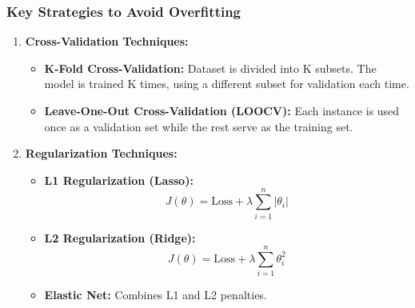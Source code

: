 \documentclass{beamer}
\begin{document}
\begin{frame}[fragile]
    \frametitle{Key Strategies to Avoid Overfitting}
    \begin{enumerate}
        \item \textbf{Cross-Validation Techniques:}
        \begin{itemize}
            \item \textbf{K-Fold Cross-Validation:} Dataset is divided into K subsets. The model is trained K times, using a different subset for validation each time.
            \item \textbf{Leave-One-Out Cross-Validation (LOOCV):} Each instance is used once as a validation set while the rest serve as the training set.
        \end{itemize}
        
        \item \textbf{Regularization Techniques:}
        \begin{itemize}
            \item \textbf{L1 Regularization (Lasso):} 
            \begin{equation}
                J(\theta) = \text{Loss} + \lambda \sum_{i=1}^n |\theta_i|
            \end{equation}
            
            \item \textbf{L2 Regularization (Ridge):} 
            \begin{equation}
                J(\theta) = \text{Loss} + \lambda \sum_{i=1}^n \theta_i^2
            \end{equation}
            
            \item \textbf{Elastic Net:} Combines L1 and L2 penalties.
        \end{itemize}
    \end{enumerate}
\end{frame}
\end{document}
